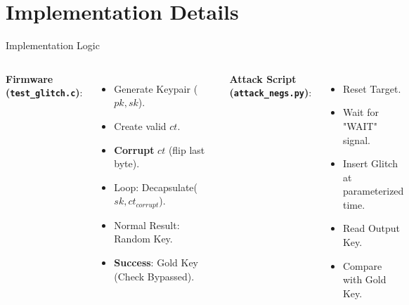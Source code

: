 \documentclass[aspectratio=169]{beamer}
\begin{document}
\section{Implementation Details}
\begin{frame}{Implementation Logic}
    \begin{columns}
        \textbf{Firmware (\texttt{test\_glitch.c})}:
        \begin{itemize}
            \item Generate Keypair ($pk, sk$).
            \item Create valid $ct$.
            \item \textbf{Corrupt} $ct$ (flip last byte).
            \item Loop: Decapsulate($sk, ct_{corrupt}$).
            \item Normal Result: Random Key.
            \item \textbf{Success}: Gold Key (Check Bypassed).
        \end{itemize}

        \textbf{Attack Script (\texttt{attack\_negs.py})}:
        \begin{itemize}
            \item Reset Target.
            \item Wait for "WAIT" signal.
            \item Insert Glitch at parameterized time.
            \item Read Output Key.
            \item Compare with Gold Key.
        \end{itemize}
    \end{columns}
\end{frame}
\end{document}
